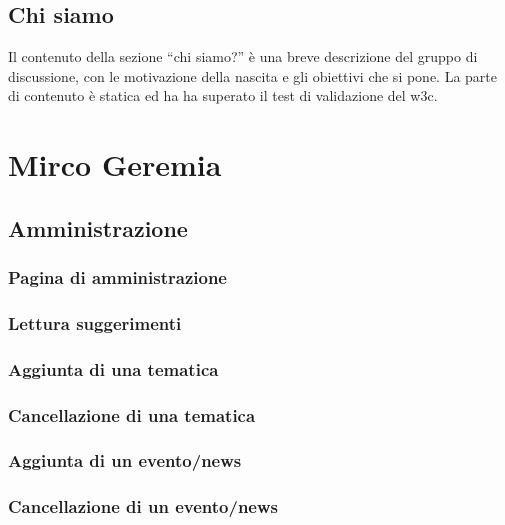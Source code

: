 \documentclass[a4paper,10pt]{article}
\begin{document}
\subsection{Chi siamo}

Il contenuto della sezione ``chi siamo?'' \`e una breve descrizione del gruppo di discussione, con le motivazione della nascita e gli obiettivi che si pone. La parte di contenuto \`e statica ed ha ha superato il test di validazione del w3c.

\section{Mirco Geremia}

\subsection{Amministrazione}

\subsubsection{Pagina di amministrazione}
\subsubsection{Lettura suggerimenti}
\subsubsection{Aggiunta di una tematica}
\subsubsection{Cancellazione di una tematica}
\subsubsection{Aggiunta di un evento/news}
\subsubsection{Cancellazione di un evento/news}
\end{document}
